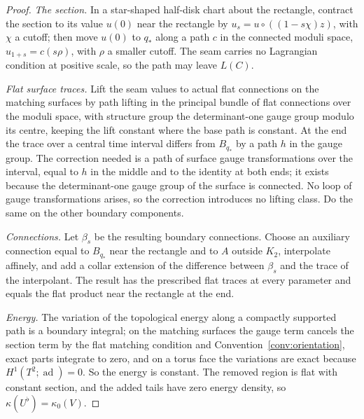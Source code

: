 \documentclass[11pt]{amsart}
\theoremstyle{definition}
\theoremstyle{remark}
\theoremstyle{plain}
\numberwithin{equation}{section}
\newcommand{\ad}{\operatorname{ad}}
\begin{document}
\begin{proof}
\emph{The section.} In a star-shaped half-disk chart about the rectangle,
contract the section to its value $u(0)$ near the rectangle by
$u_s=u\circ((1-s\chi)z)$, with $\chi$ a cutoff; then move $u(0)$ to $q_*$
along a path $c$ in the connected moduli space, $u_{1+s}=c(s\rho)$, with
$\rho$ a smaller cutoff. The seam carries no Lagrangian condition at
positive scale, so the path may leave $L(C)$.

\emph{Flat surface traces.} Lift the seam values to actual flat
connections on the matching surfaces by path lifting in the principal
bundle of flat connections over the moduli space, with structure group the
determinant-one gauge group modulo its centre, keeping the lift constant
where the base path is constant. At the end the trace over a central time
interval differs from $B_{q_*}$ by a path $h$ in the gauge group. The
correction needed is a path of surface gauge transformations over the
interval, equal to $h$ in the middle and to the identity at both ends; it
exists because the determinant-one gauge group of the surface is connected.
No loop of gauge transformations arises, so the correction introduces no lifting class. Do the same on the other boundary components.

\emph{Connections.} Let $\beta_s$ be the resulting boundary connections.
Choose an auxiliary connection equal to $B_{q_*}$ near the rectangle and
to $A$ outside $K_2$, interpolate affinely, and add a collar extension of
the difference between $\beta_s$ and the trace of the interpolant. The
result has the prescribed flat traces at every parameter and equals the
flat product near the rectangle at the end.

\emph{Energy.} The variation of the topological energy along a compactly
supported path is a boundary integral; on the matching surfaces the gauge
term cancels the section term by the flat matching condition and
Convention~\ref{conv:orientation}, exact parts integrate to zero, and on a
torus face the variations are exact because $H^1(T^2;\ad)=0$. So the
energy is constant. The removed region is flat with constant section, and
the added tails have zero energy density, so $\kappa(U^\flat)=\kappa_0(V)$.
\end{proof}
\end{document}
